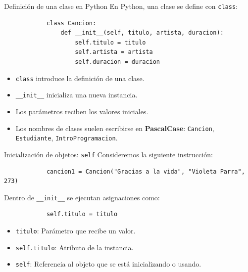 \documentclass{beamer}
\begin{document}
    \begin{frame}[fragile,t]{Definición de una clase en Python}
        En Python, una clase se define con \texttt{class}:
        \begin{verbatim}
            class Cancion:
                def __init__(self, titulo, artista, duracion):
                    self.titulo = titulo
                    self.artista = artista
                    self.duracion = duracion
        \end{verbatim}
        \pause
        \begin{itemize}
            \item \texttt{class} introduce la definición de una clase.
            \item \texttt{__init__} inicializa una nueva instancia.
            \item Los parámetros reciben los valores iniciales.
            \item Los nombres de clases suelen escribirse en \textbf{PascalCase}: \texttt{Cancion}, 
            \texttt{Estudiante}, \texttt{IntroProgramacion}.
        \end{itemize}
    \end{frame}
    
    \begin{frame}[fragile,t]{Inicialización de objetos: \texttt{self}}
        Consideremos la siguiente instrucción:
        \begin{verbatim}
            cancion1 = Cancion("Gracias a la vida", "Violeta Parra", 273)
        \end{verbatim}
        Dentro de \texttt{__init__} se ejecutan asignaciones como:
        \begin{verbatim}
            self.titulo = titulo
        \end{verbatim}
        \pause
        \begin{itemize}
            \item \texttt{titulo}: Parámetro que recibe un valor.
            \item \texttt{self.titulo}: Atributo de la instancia.
            \item \texttt{self}: Referencia al objeto que se está inicializando o usando.
        \end{itemize}
    \end{frame}
\end{document}
